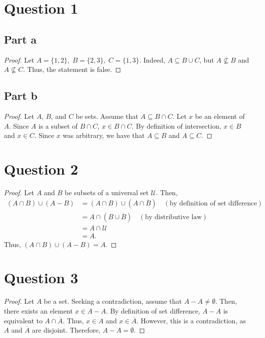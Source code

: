 \documentclass{article}
\begin{document}
\section*{Question 1}

\subsection*{Part a}
\renewcommand*{\proofname}{Disproof}
\begin{proof}
    Let $A = \{1, 2\}, \; B = \{2, 3\}, \; C = \{1, 3\}$.
    Indeed, $A \subseteq B \cup C$, but $A \nsubseteq B$ and $A \nsubseteq C$.
    Thus, the statement is false.
\end{proof}

\subsection*{Part b}
\renewcommand*{\proofname}{Proof}
\begin{proof}
    Let $A$, $B$, and $C$ be sets.
    Assume that $A \subseteq B \cap C$.
    Let $x$ be an element of $A$.
    Since $A$ is a subset of $B \cap C$, $x \in B \cap C$.
    By definition of intersection, $x \in B$ and $x \in C$.
    Since $x$ was arbitrary, we have that $A \subseteq B$ and $A \subseteq C$.
\end{proof}

\section*{Question 2}
\begin{proof}
    Let $A$ and $B$ be subsets of a universal set $\mathcal{U}$.
    Then,
    \begin{align*}
        (A \cap B) \cup (A - B) &= (A \cap B) \cup (A \cap \overline{B}) \quad (\text{by definition of set difference}) \\
        &= A \cap (B \cup \overline{B}) \quad (\text{by distributive law}) \\
        &= A \cap \mathcal{U} \\
        &= A.
    \end{align*}
    Thus, $(A \cap B) \cup (A - B) = A$.
\end{proof}

\section*{Question 3}
\begin{proof}
    Let $A$ be a set.
    Seeking a contradiction, assume that $A - A \neq \emptyset$.
    Then, there exists an element $x \in A - A$.
    By definition of set difference, $A - A$ is equivalent to $A \cap \overline{A}$.
    Thus, $x \in A$ and $x \in \overline{A}$.
    However, this is a contradiction, as $A$ and $\overline{A}$ are disjoint.
    Therefore, $A - A = \emptyset$.
\end{proof}
\end{document}
